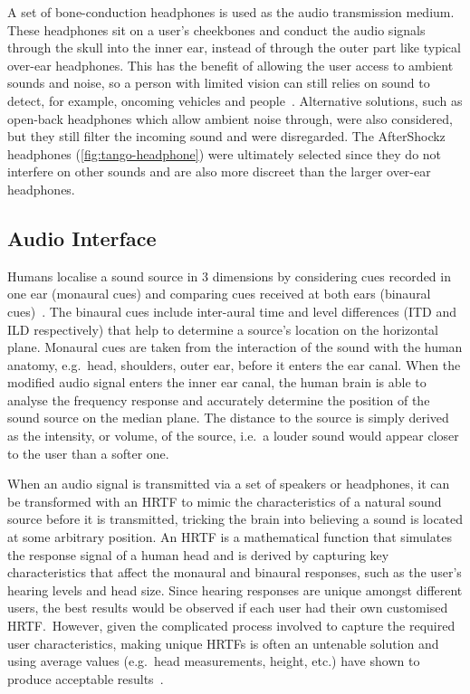 \documentclass[]{interact}
\begin{document}
A set of bone-conduction headphones is used as the audio transmission medium.
These headphones sit on a user's cheekbones and conduct the audio signals through the skull into the inner ear, instead of through the outer part like typical over-ear headphones. 
This has the benefit of allowing the user access to ambient sounds and noise, so a person with limited vision can still relies on sound to detect, for example, oncoming vehicles and people~\citep{lichtenstein2012headphone}.
Alternative solutions, such as open-back headphones which allow ambient noise through, were also considered, but they still filter the incoming sound and were disregarded.
The AfterShockz headphones (\cref{fig:tango-headphone}) were ultimately selected since they do not interfere on other sounds and are also more discreet than the larger over-ear headphones. 

\subsection{Audio Interface}

Humans localise a sound source in 3 dimensions by considering cues recorded in one ear (monaural cues) and comparing cues received at both ears (binaural cues)~\citep{blauert1997spatial,blauert1969sound}.
The binaural cues include inter-aural time and level differences (ITD and ILD respectively) that help to determine a source's location on the horizontal plane.
Monaural cues are taken from the interaction of the sound with the human anatomy, e.g.\ head, shoulders, outer ear, before it enters the ear canal.
When the modified audio signal enters the inner ear canal, the human brain is able to analyse the frequency response and accurately determine the position of the sound source on the median plane. 
The distance to the source is simply derived as the intensity, or volume, of the source, i.e.\ a louder sound would appear closer to the user than a softer one. 

When an audio signal is transmitted via a set of speakers or headphones, it can be transformed with an HRTF to mimic the characteristics of a natural sound source before it is transmitted, tricking the brain into believing a sound is located at some arbitrary position.
An HRTF is a mathematical function that simulates the response signal of a human head and is derived by capturing key characteristics that affect the monaural and binaural responses, such as the user's hearing levels and head size.
Since hearing responses are unique amongst different users, the best results would be observed if each user had their own customised HRTF.\
However, given the complicated process involved to capture the required user characteristics, making unique HRTFs is often an untenable solution and using average values (e.g.\ head measurements, height, etc.) have shown to produce acceptable results~\citep{gardner1995hrtf}.
\end{document}

